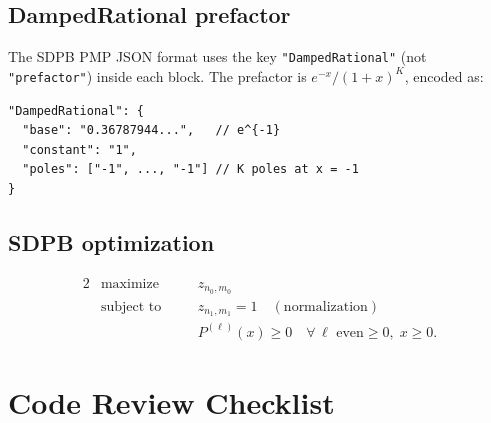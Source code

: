 \documentclass{article}
\begin{document}
\subsection{DampedRational prefactor}

The SDPB PMP JSON format uses the key \texttt{"DampedRational"} (not \texttt{"prefactor"})
inside each block.  The prefactor is $e^{-x}/(1+x)^K$, encoded as:
\begin{verbatim}
"DampedRational": {
  "base": "0.36787944...",   // e^{-1}
  "constant": "1",
  "poles": ["-1", ..., "-1"] // K poles at x = -1
}
\end{verbatim}

\subsection{SDPB optimization}

\begin{alignat}{2}
  &\text{maximize}  &&\quad z_{n_0,m_0} \nonumber\\
  &\text{subject to}&&\quad z_{n_1,m_1} = 1 \quad(\text{normalization}) \nonumber\\
  &                 &&\quad P^{(\ell)}(x)\ge0\quad\forall\,\ell\text{ even}\ge0,\;x\ge0.
\end{alignat}

\section{Code Review Checklist}
\end{document}
